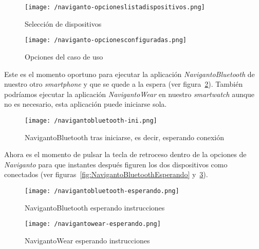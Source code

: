 \begin{figure}[!h]
  \begin{minipage}[b]{0.5\linewidth}
    \begin{center}
      \texttt{[image: /naviganto-opcioneslistadispositivos.png]}
      \caption{Selección de dispositivos}
      \label{fig:navigantoOpcionesSelecionaDispositivos}
    \end{center}
  \end{minipage}
  \begin{minipage}[b]{0.5\linewidth}
    \begin{center}
      \texttt{[image: /naviganto-opcionesconfiguradas.png]}
      \caption{Opciones del caso de uso}
      \label{fig:navigantoOpcionesCasoDeUso}
    \end{center}
  \end{minipage}
\end{figure}

Este es el momento oportuno para ejecutar la aplicación \emph{NavigantoBluetooth} de nuestro otro
\emph{smartphone} y que se quede a la espera (ver
figura~\ref{fig:navigantoBluetoothIniciado}). También podríamos ejecutar la aplicación
\emph{NavigantoWear} en nuestro \emph{smartwatch} aunque no es necesario, esta aplicación puede
iniciarse sola.

\begin{figure}[!h]
  \begin{center}
    \texttt{[image: /navigantobluetooth-ini.png]}
    \caption{NavigantoBluetooth tras iniciarse, es decir, esperando conexión}
    \label{fig:navigantoBluetoothIniciado}
  \end{center}
\end{figure}

Ahora es el momento de pulsar la tecla de retroceso dentro de la opciones de \emph{Naviganto} para
que instantes después figuren los dos dispositivos como conectados (ver
figuras~\ref{fig:NavigantoBluetoothEsperando} y~\ref{fig:NavigantowearEsperando}).

\begin{figure}[!h]
  \begin{minipage}[b]{0.5\linewidth}
    \begin{center}
      \texttt{[image: /navigantobluetooth-esperando.png]}
      \caption{NavigantoBluetooth esperando instrucciones}
      \label{fig:NavigantoBluetoothEsperando}
    \end{center}
  \end{minipage}
  \begin{minipage}[b]{0.5\linewidth}
    \begin{center}
      \texttt{[image: /navigantowear-esperando.png]}
      \caption{NavigantoWear esperando instrucciones}
      \label{fig:NavigantowearEsperando}
    \end{center}
  \end{minipage}
\end{figure}

